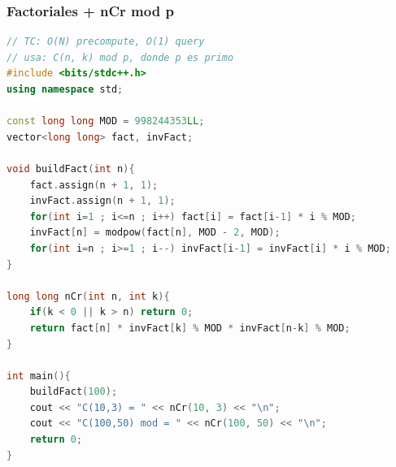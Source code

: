 \subsubsection{Factoriales + nCr mod p}
\begin{lstlisting}[style=mystyle, language=C++]
// TC: O(N) precompute, O(1) query
// usa: C(n, k) mod p, donde p es primo
#include <bits/stdc++.h>
using namespace std;

const long long MOD = 998244353LL;
vector<long long> fact, invFact;

void buildFact(int n){
	fact.assign(n + 1, 1);
	invFact.assign(n + 1, 1);
	for(int i=1 ; i<=n ; i++) fact[i] = fact[i-1] * i % MOD;
	invFact[n] = modpow(fact[n], MOD - 2, MOD);
	for(int i=n ; i>=1 ; i--) invFact[i-1] = invFact[i] * i % MOD;
}

long long nCr(int n, int k){
	if(k < 0 || k > n) return 0;
	return fact[n] * invFact[k] % MOD * invFact[n-k] % MOD;
}

int main(){
	buildFact(100);
	cout << "C(10,3) = " << nCr(10, 3) << "\n";
	cout << "C(100,50) mod = " << nCr(100, 50) << "\n";
	return 0;
}
\end{lstlisting}
